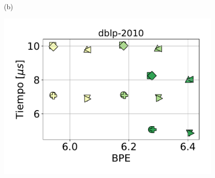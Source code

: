 \begin{figure}
\begin{minipage}{1\textwidth}
\begin{minipage}{0.45\textwidth}
\begin{minipage}{0.2\textwidth}
    			\end{minipage}
    			
    			(b)
    		\end{minipage}  		
    	\end{minipage}
    	
    	\begin{minipage}{1\textwidth}
    		\centering
    		\begin{minipage}{0.45\textwidth}
    			\centering
    			\begin{minipage}{0.75\textwidth}
    				\centering
    				\includegraphics[width=1\linewidth]{img/sdsl/aleatorio/dblp-2010.pdf}
    			\end{minipage}
    			\begin{minipage}{0.2\textwidth}
    				\centering

\end{minipage}
\end{minipage}
\end{minipage}
\end{figure}
